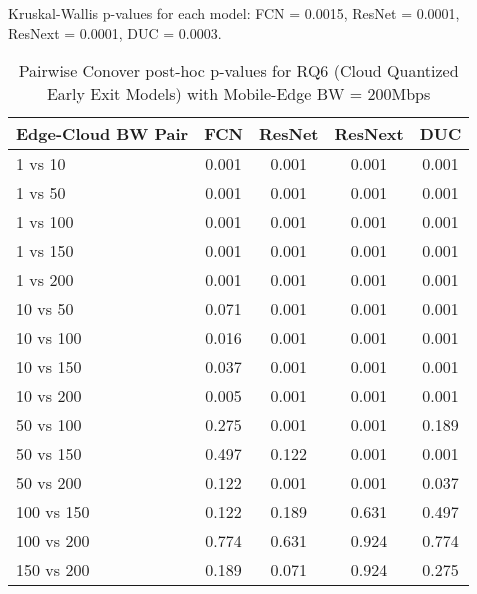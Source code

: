 \begin{table}[h]
\centering
\caption{Pairwise Conover post-hoc p-values for RQ6 (Cloud Quantized Early Exit Models) with Mobile-Edge BW = 200Mbps}
\label{tab:conover_cloud_quantized_earlyexit_me200}
\smallskip
Kruskal-Wallis p-values for each model: FCN = 0.0015, ResNet = 0.0001, ResNext = 0.0001, DUC = 0.0003.

\begin{tabular}{lcccc}
\toprule
Edge-Cloud BW Pair & FCN & ResNet & ResNext & DUC \\
\midrule
1 vs 10 & 0.001 & 0.001 & 0.001 & 0.001 \\
1 vs 50 & 0.001 & 0.001 & 0.001 & 0.001 \\
1 vs 100 & 0.001 & 0.001 & 0.001 & 0.001 \\
1 vs 150 & 0.001 & 0.001 & 0.001 & 0.001 \\
1 vs 200 & 0.001 & 0.001 & 0.001 & 0.001 \\
10 vs 50 & 0.071 & 0.001 & 0.001 & 0.001 \\
10 vs 100 & 0.016 & 0.001 & 0.001 & 0.001 \\
10 vs 150 & 0.037 & 0.001 & 0.001 & 0.001 \\
10 vs 200 & 0.005 & 0.001 & 0.001 & 0.001 \\
50 vs 100 & 0.275 & 0.001 & 0.001 & 0.189 \\
50 vs 150 & 0.497 & 0.122 & 0.001 & 0.001 \\
50 vs 200 & 0.122 & 0.001 & 0.001 & 0.037 \\
100 vs 150 & 0.122 & 0.189 & 0.631 & 0.497 \\
100 vs 200 & 0.774 & 0.631 & 0.924 & 0.774 \\
150 vs 200 & 0.189 & 0.071 & 0.924 & 0.275 \\
\bottomrule
\end{tabular}
\end{table}

